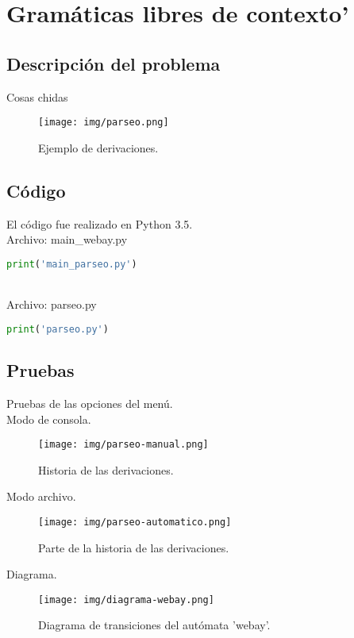 \section{Gramáticas libres de contexto'}
	\subsection{Descripción del problema}
	Cosas chidas
	\begin{figure}[H]
		\begin{center}
		\texttt{[image: img/parseo.png]}
		\caption{Ejemplo de derivaciones.}
		\label{fig:parseo-1}
		\end{center}
	\end{figure}
	\subsection{Código}
	El código fue realizado en Python 3.5.
	\\Archivo: main\_webay.py
	\begin{lstlisting}[language=Python]
	print('main_parseo.py')
	\end{lstlisting}
	\\Archivo: parseo.py
	\begin{lstlisting}[language=Python]
	print('parseo.py')
	\end{lstlisting}
	\subsection{Pruebas}
	Pruebas de las opciones del menú.
	\\
	{\large Modo de consola.}
	\begin{figure}[H]
		\begin{center}
			\texttt{[image: img/parseo-manual.png]}
			\caption{Historia de las derivaciones.}
			\label{fig:parseo1}
		\end{center}
	\end{figure}
	{\large Modo archivo.}
	\begin{figure}[H]
		\begin{center}
			\texttt{[image: img/parseo-automatico.png]}
			\caption{Parte de la historia de las derivaciones.}
			\label{fig:parseo2}
		\end{center}
	\end{figure}
	{\large Diagrama.}
	\begin{figure}[H]
		\begin{center}
			\texttt{[image: img/diagrama-webay.png]}
			\caption{Diagrama de transiciones del autómata 'webay'.}
			\label{fig:webay3}
		\end{center}
	\end{figure}